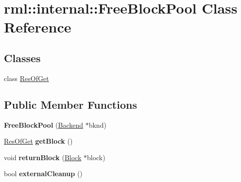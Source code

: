 \hypertarget{classrml_1_1internal_1_1FreeBlockPool}{}\section{rml\+:\+:internal\+:\+:Free\+Block\+Pool Class Reference}
\label{classrml_1_1internal_1_1FreeBlockPool}
\subsection*{Classes}
\begin{DoxyCompactItemize}
\item 
class \hyperlink{classrml_1_1internal_1_1FreeBlockPool_1_1ResOfGet}{Res\+Of\+Get}
\end{DoxyCompactItemize}
\subsection*{Public Member Functions}
\begin{DoxyCompactItemize}
\item 
\hypertarget{classrml_1_1internal_1_1FreeBlockPool_aad05cb886a99827d6c90b58d0707e2f9}{}{\bfseries Free\+Block\+Pool} (\hyperlink{classrml_1_1internal_1_1Backend}{Backend} $\ast$bknd)\label{classrml_1_1internal_1_1FreeBlockPool_aad05cb886a99827d6c90b58d0707e2f9}

\item 
\hypertarget{classrml_1_1internal_1_1FreeBlockPool_a3d6745e31d1a809ce90273ba7a8f8ab7}{}\hyperlink{classrml_1_1internal_1_1FreeBlockPool_1_1ResOfGet}{Res\+Of\+Get} {\bfseries get\+Block} ()\label{classrml_1_1internal_1_1FreeBlockPool_a3d6745e31d1a809ce90273ba7a8f8ab7}

\item 
\hypertarget{classrml_1_1internal_1_1FreeBlockPool_a98adf682213916f2d39812b170938b4a}{}void {\bfseries return\+Block} (\hyperlink{classrml_1_1internal_1_1Block}{Block} $\ast$block)\label{classrml_1_1internal_1_1FreeBlockPool_a98adf682213916f2d39812b170938b4a}

\item 
\hypertarget{classrml_1_1internal_1_1FreeBlockPool_ab61c0024cb476fa6efa9748f257bfa39}{}bool {\bfseries external\+Cleanup} ()\label{classrml_1_1internal_1_1FreeBlockPool_ab61c0024cb476fa6efa9748f257bfa39}

\end{DoxyCompactItemize}
